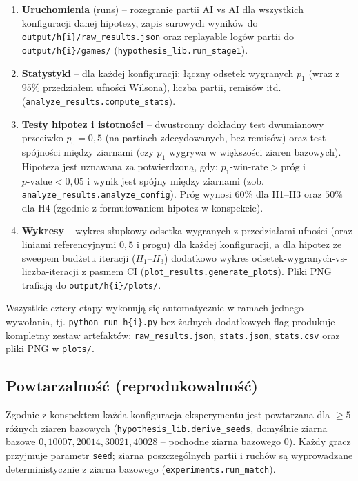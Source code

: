 \documentclass[11pt,a4paper]{article}
\begin{document}
\begin{enumerate}
    \item \textbf{Uruchomienia} (runs) -- rozegranie partii
        AI vs AI dla wszystkich konfiguracji danej hipotezy, zapis
        surowych wyników do \texttt{output/h\{i\}/raw\_results.json}
        oraz replayable logów partii do \texttt{output/h\{i\}/games/}
        (\texttt{hypothesis\_lib.run\_stage1}).
    \item \textbf{Statystyki} -- dla każdej konfiguracji: łączny
        odsetek wygranych $p_1$ (wraz z 95\% przedziałem ufności
        Wilsona), liczba partii, remisów itd.
        (\texttt{analyze\_results.compute\_stats}).
    \item \textbf{Testy hipotez i istotności} -- dwustronny dokładny test
        dwumianowy przeciwko $p_0=0{,}5$ (na partiach zdecydowanych,
        bez remisów) oraz test spójności między ziarnami (czy $p_1$
        wygrywa w większości ziaren bazowych). Hipoteza jest uznawana za
        potwierdzoną, gdy: $p_1\text{-win-rate} > \text{próg}$ i
        $p\text{-value} < 0{,}05$ i wynik jest spójny między
        ziarnami (zob. \texttt{analyze\_results.analyze\_config}). Próg
        wynosi $60\%$ dla H1--H3 oraz $50\%$ dla H4 (zgodnie z
        formułowaniem hipotez w konspekcie).
    \item \textbf{Wykresy} -- wykres słupkowy odsetka wygranych z
        przedziałami ufności (oraz liniami referencyjnymi $0{,}5$ i
        progu) dla każdej konfiguracji, a dla hipotez ze sweepem
        budżetu iteracji ($H_1$--$H_3$) dodatkowo wykres
        odsetek-wygranych-vs-liczba-iteracji z pasmem CI
        (\texttt{plot\_results.generate\_plots}). Pliki PNG trafiają do
        \texttt{output/h\{i\}/plots/}.
\end{enumerate}

Wszystkie cztery etapy wykonują się automatycznie w ramach jednego
wywołania, tj. \texttt{python run\_h\{i\}.py} bez żadnych dodatkowych
flag produkuje kompletny zestaw artefaktów: \texttt{raw\_results.json},
\texttt{stats.json}, \texttt{stats.csv} oraz pliki PNG w
\texttt{plots/}.

\subsection{Powtarzalność (reprodukowalność)}
\label{sec:reprodukowalnosc}

Zgodnie z konspektem każda konfiguracja eksperymentu jest powtarzana dla
$\geq 5$ różnych ziaren bazowych
(\texttt{hypothesis\_lib.derive\_seeds}, domyślnie ziarna bazowe
$0, 10007, 20014, 30021, 40028$ -- pochodne ziarna
bazowego $0$). Każdy gracz przyjmuje parametr \texttt{seed}; ziarna
poszczególnych partii i ruchów są wyprowadzane deterministycznie z ziarna
bazowego (\texttt{experiments.run\_match}).
\end{document}
